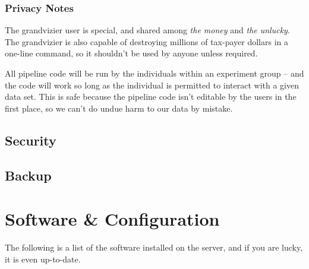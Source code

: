 \documentclass[final,titlepage,letterpaper,oneside,12pt]{article}
\renewcommand{\texttt}[2][BrickRed]{\textcolor{#1}{\ttfamily #2}}%
\begin{document}
\subsubsection{Privacy Notes}

The \texttt{grandvizier} user is special, and shared among \textit{the money} and \textit{the unlucky}. The \texttt{grandvizier} is also capable of  destroying millions of tax-payer dollars in a one-line command, so it shouldn't be used by anyone unless required.

All pipeline code will be run by the individuals within an experiment group -- and the code will work so long as the individual is permitted to interact with a given data set. This is safe because the pipeline code isn't editable by the users in the first place, so we can't do undue harm to our data by mistake.

\subsection{Security}
\subsection{Backup}

\section{Software \& Configuration}

The following is a list of the software installed on the server, and if you are lucky, it is even up-to-date.
\end{document}
